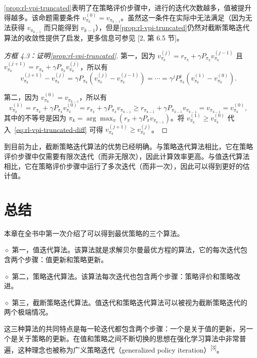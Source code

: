 \cref{prop:rl-vpi-truncated}表明了在策略评价步骤中，进行的迭代次数越多，值被提升得越多。该命题需要条件 $v_{\pi_k}^{(0)} = v_{\pi_{k-1}}$。虽然这一条件在实际中无法满足（因为无法获得 $v_{\pi_{k-1}}$ 而只能得到 $v_{k-1}$），但是\cref{prop:rl-vpi-truncated}仍然对截断策略迭代算法的收敛性提供了启发，更多信息可参见 [2, 第 6.5 节]。

\begin{proof}[方框 4.3：证明\cref{prop:rl-vpi-truncated}]
第一，因为 $v_{\pi_k}^{(j)} = r_{\pi_k} + \gamma P_{\pi_k} v_{\pi_k}^{(j-1)}$ 且 $v_{\pi_k}^{(j+1)} = r_{\pi_k} + \gamma P_{\pi_k} v_{\pi_k}^{(j)}$，所以有
\begin{equation}
\label{eq:rl-vpi-truncated-diff}
v_{\pi_{k}}^{(j+1)} - v_{\pi_{k}}^{(j)} = \gamma P_{\pi_{k}} (v_{\pi_{k}}^{(j)} - v_{\pi_{k}}^{(j-1)}) = \cdots = \gamma^{j} P_{\pi_{k}}^{j} (v_{\pi_{k}}^{(1)} - v_{\pi_{k}}^{(0)}).
\end{equation}

第二，因为 $v_{\pi_k}^{(0)} = v_{\pi_{k-1}}$，所以有
$$
v_{\pi_{k}}^{(1)} = r_{\pi_{k}} + \gamma P_{\pi_{k}} v_{\pi_{k}}^{(0)} = r_{\pi_{k}} + \gamma P_{\pi_{k}} v_{\pi_{k-1}} \geqslant r_{\pi_{k-1}} + \gamma P_{\pi_{k-1}} v_{\pi_{k-1}} = v_{\pi_{k-1}} = v_{\pi_{k}}^{(0)},
$$
其中的不等号是因为 $\pi_{k} = \arg\max_{\pi}(r_{\pi} + \gamma P_{\pi} v_{\pi_{k-1}})$。将 $v_{\pi_k}^{(1)} \geqslant v_{\pi_k}^{(0)}$ 代入~\eqref{eq:rl-vpi-truncated-diff} 可得 $v_{\pi_k}^{(j+1)} \geqslant v_{\pi_k}^{(j)}$。
\end{proof}

到目前为止，截断策略迭代算法的优势已经明确。与策略迭代算法相比，它在策略评价步骤中仅需要有限次迭代（而非无限次），因此计算效率更高。与值迭代算法相比，它在策略评价步骤中运行了多次迭代（而非一次），因此可以得到更好的估计值。

\section{总结}
\label{sec:rl-vpi-summary}

本章在全书中第一次介绍了可以得到最优策略的三个算法。

$\diamond$ 第一，值迭代算法。该算法就是求解贝尔曼最优方程的算法，它的每次迭代包含两个步骤：值更新和策略更新。

$\diamond$ 第二，策略迭代算法。该算法每次迭代也包含两个步骤：策略评价和策略改进。

$\diamond$ 第三，截断策略迭代算法。值迭代和策略迭代算法可以被视为截断策略迭代的两个极端情况。

这三种算法的共同特点是每一轮迭代都包含两个步骤：一个是关于值的更新，另一个是关于策略的更新。在值和策略之间不断切换的思想在强化学习算法中非常普遍，这种理念也被称为广义策略迭代（generalized policy iteration）\textsuperscript{[3]}。


